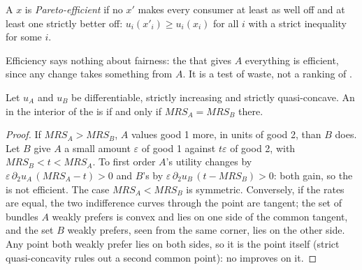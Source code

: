 \begin{definition}\label{def:b2:exchange-economies:pareto-efficient}
A  $x$ is \emph{Pareto-efficient} if no  $x'$ makes every consumer at least as well off and at least one strictly better off:
$u_i(x'_i) \ge u_i(x_i)$ for all $i$ with a strict inequality for some $i$.
\end{definition}

Efficiency says nothing about fairness: the  that gives $A$ everything is efficient, since any
change takes something from $A$. It is a test of waste, not a ranking of .

\begin{proposition}[Tangency]\label{prop:b2:exchange-economies:tangency}
Let $u_A$ and $u_B$ be differentiable, strictly increasing and strictly quasi-concave. An  in
the interior of the  is  if and only if $\mathit{MRS}_A = \mathit{MRS}_B$
there.
\end{proposition}

\begin{proof}
If $\mathit{MRS}_A > \mathit{MRS}_B$, $A$ values good 1 more, in units of good 2, than $B$ does. Let $B$
give $A$ a small amount $\varepsilon$ of good 1 against $t\varepsilon$ of good 2, with $\mathit{MRS}_B <
t < \mathit{MRS}_A$. To first order $A$'s utility changes by $\varepsilon\,\partial_2 u_A\,
(\mathit{MRS}_A - t) > 0$ and $B$'s by $\varepsilon\,\partial_2 u_B\,(t - \mathit{MRS}_B) > 0$: both gain,
so the  is not efficient. The case $\mathit{MRS}_A < \mathit{MRS}_B$ is symmetric. Conversely,
if the rates are equal, the two indifference curves through the point are tangent; the set of bundles
$A$ weakly prefers is convex and lies on one side of the common tangent, and the set $B$ weakly prefers,
seen from the same corner, lies on the other side. Any point both weakly prefer lies on both sides, so it
is the point itself (strict quasi-concavity rules out a second common point): no 
improves on it.
\end{proof}

